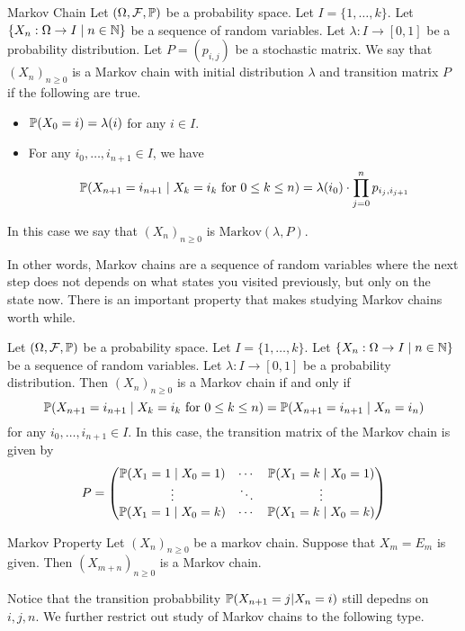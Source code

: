 \documentclass[a4paper]{article}
\begin{document}
\begin{defn}{Markov Chain}{} Let $(\Omega,\mathcal{F},\mathbb{P})$ be a probability space. Let $I=\{1,\dots,k\}$. Let $\{X_n:\Omega\to I\;|\;n\in\mathbb{N}\}$ be a sequence of random variables. Let $\lambda:I\to[0,1]$ be a probability distribution. Let $P=(p_{i,j})$ be a stochastic matrix. We say that $(X_n)_{n\geq 0}$ is a Markov chain with initial distribution $\lambda$ and transition matrix $P$ if the following are true. 
\begin{itemize}
\item $\mathbb{P}(X_0=i)=\lambda(i)$ for any $i\in I$. 
\item For any $i_0,\dots,i_{n+1}\in I$, we have $$\mathbb{P}(X_{n+1}=i_{n+1}\;|\;X_k=i_k\text{ for }0\leq k\leq n)=\lambda(i_0)\cdot\prod_{j=0}^n p_{i_j,i_{j+1}}$$ 
\end{itemize}
In this case we say that $(X_n)_{n\geq 0}$ is $\text{Markov}(\lambda,P)$. 
\end{defn}

In other words, Markov chains are a sequence of random variables where the next step does not depends on what states you visited previously, but only on the state now. There is an important property that makes studying Markov chains worth while. 

\begin{prp}{}{} Let $(\Omega,\mathcal{F},\mathbb{P})$ be a probability space. Let $I=\{1,\dots,k\}$. Let $\{X_n:\Omega\to I\;|\;n\in\mathbb{N}\}$ be a sequence of random variables. Let $\lambda:I\to[0,1]$ be a probability distribution. Then $(X_n)_{n\geq 0}$ is a Markov chain if and only if $$\mathbb{P}(X_{n+1}=i_{n+1}\;|\;X_k=i_k\text{ for }0\leq k\leq n)=\mathbb{P}(X_{n+1}=i_{n+1}\;|\;X_n=i_n)$$ for any $i_0,\dots,i_{n+1}\in I$. In this case, the transition matrix of the Markov chain is given by $$P=\begin{pmatrix}
\mathbb{P}(X_1=1\;|\;X_0=1) & \cdots & \mathbb{P}(X_1=k\;|\;X_0=1)\\
\vdots & \ddots & \vdots\\
\mathbb{P}(X_1=1\;|\;X_0=k) & \cdots & \mathbb{P}(X_1=k\;|\;X_0=k)
\end{pmatrix}$$
\end{prp}

\begin{thm}{Markov Property}{} Let $(X_n)_{n\geq0}$ be a markov chain. Suppose that $X_m=E_m$ is given. Then $(X_{m+n})_{n\geq 0}$ is a Markov chain. 
\end{thm}


Notice that the transition probabbility $\mathbb{P}(X_{n+1}=j|X_n=i)$ still depedns on $i,j,n$. We further restrict out study of Markov chains to the following type. 
\end{document}
